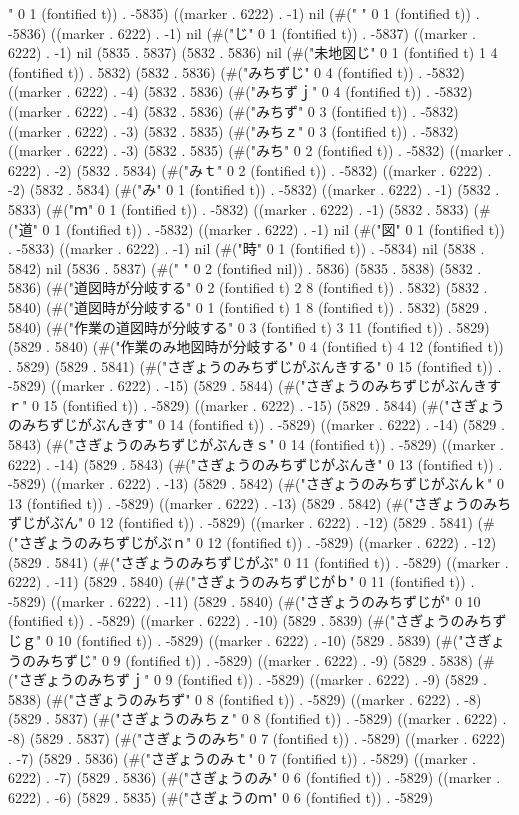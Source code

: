{" 0 1 (fontified t)) . -5835) ((marker . 6222) . -1) nil (#("	" 0 1 (fontified t)) . -5836) ((marker . 6222) . -1) nil (#("じ" 0 1 (fontified t)) . -5837) ((marker . 6222) . -1) nil (5835 . 5837) (5832 . 5836) nil (#("未地図じ" 0 1 (fontified t) 1 4 (fontified t)) . 5832) (5832 . 5836) (#("みちずじ" 0 4 (fontified t)) . -5832) ((marker . 6222) . -4) (5832 . 5836) (#("みちずｊ" 0 4 (fontified t)) . -5832) ((marker . 6222) . -4) (5832 . 5836) (#("みちず" 0 3 (fontified t)) . -5832) ((marker . 6222) . -3) (5832 . 5835) (#("みちｚ" 0 3 (fontified t)) . -5832) ((marker . 6222) . -3) (5832 . 5835) (#("みち" 0 2 (fontified t)) . -5832) ((marker . 6222) . -2) (5832 . 5834) (#("みｔ" 0 2 (fontified t)) . -5832) ((marker . 6222) . -2) (5832 . 5834) (#("み" 0 1 (fontified t)) . -5832) ((marker . 6222) . -1) (5832 . 5833) (#("ｍ" 0 1 (fontified t)) . -5832) ((marker . 6222) . -1) (5832 . 5833) (#("道" 0 1 (fontified t)) . -5832) ((marker . 6222) . -1) nil (#("図" 0 1 (fontified t)) . -5833) ((marker . 6222) . -1) nil (#("時" 0 1 (fontified t)) . -5834) nil (5838 . 5842) nil (5836 . 5837) (#("  " 0 2 (fontified nil)) . 5836) (5835 . 5838) (5832 . 5836) (#("道図時が分岐する" 0 2 (fontified t) 2 8 (fontified t)) . 5832) (5832 . 5840) (#("道図時が分岐する" 0 1 (fontified t) 1 8 (fontified t)) . 5832) (5829 . 5840) (#("作業の道図時が分岐する" 0 3 (fontified t) 3 11 (fontified t)) . 5829) (5829 . 5840) (#("作業のみ地図時が分岐する" 0 4 (fontified t) 4 12 (fontified t)) . 5829) (5829 . 5841) (#("さぎょうのみちずじがぶんきする" 0 15 (fontified t)) . -5829) ((marker . 6222) . -15) (5829 . 5844) (#("さぎょうのみちずじがぶんきすｒ" 0 15 (fontified t)) . -5829) ((marker . 6222) . -15) (5829 . 5844) (#("さぎょうのみちずじがぶんきす" 0 14 (fontified t)) . -5829) ((marker . 6222) . -14) (5829 . 5843) (#("さぎょうのみちずじがぶんきｓ" 0 14 (fontified t)) . -5829) ((marker . 6222) . -14) (5829 . 5843) (#("さぎょうのみちずじがぶんき" 0 13 (fontified t)) . -5829) ((marker . 6222) . -13) (5829 . 5842) (#("さぎょうのみちずじがぶんｋ" 0 13 (fontified t)) . -5829) ((marker . 6222) . -13) (5829 . 5842) (#("さぎょうのみちずじがぶん" 0 12 (fontified t)) . -5829) ((marker . 6222) . -12) (5829 . 5841) (#("さぎょうのみちずじがぶｎ" 0 12 (fontified t)) . -5829) ((marker . 6222) . -12) (5829 . 5841) (#("さぎょうのみちずじがぶ" 0 11 (fontified t)) . -5829) ((marker . 6222) . -11) (5829 . 5840) (#("さぎょうのみちずじがｂ" 0 11 (fontified t)) . -5829) ((marker . 6222) . -11) (5829 . 5840) (#("さぎょうのみちずじが" 0 10 (fontified t)) . -5829) ((marker . 6222) . -10) (5829 . 5839) (#("さぎょうのみちずじｇ" 0 10 (fontified t)) . -5829) ((marker . 6222) . -10) (5829 . 5839) (#("さぎょうのみちずじ" 0 9 (fontified t)) . -5829) ((marker . 6222) . -9) (5829 . 5838) (#("さぎょうのみちずｊ" 0 9 (fontified t)) . -5829) ((marker . 6222) . -9) (5829 . 5838) (#("さぎょうのみちず" 0 8 (fontified t)) . -5829) ((marker . 6222) . -8) (5829 . 5837) (#("さぎょうのみちｚ" 0 8 (fontified t)) . -5829) ((marker . 6222) . -8) (5829 . 5837) (#("さぎょうのみち" 0 7 (fontified t)) . -5829) ((marker . 6222) . -7) (5829 . 5836) (#("さぎょうのみｔ" 0 7 (fontified t)) . -5829) ((marker . 6222) . -7) (5829 . 5836) (#("さぎょうのみ" 0 6 (fontified t)) . -5829) ((marker . 6222) . -6) (5829 . 5835) (#("さぎょうのｍ" 0 6 (fontified t)) . -5829) }
